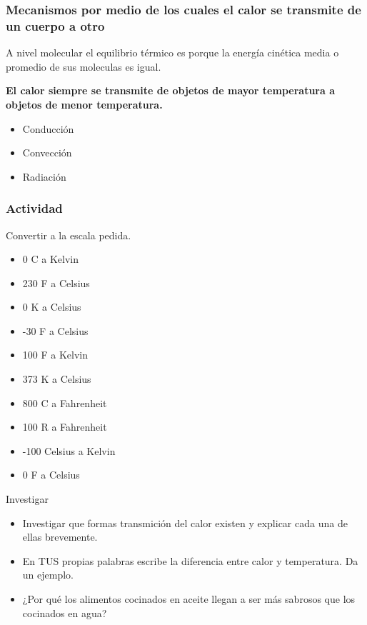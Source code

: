 \documentclass[handout]{beamer}
\begin{document}
\begin{frame}
  \frametitle{Mecanismos por medio de los cuales el calor se transmite de un cuerpo a
    otro}
  \begin{block}{}
    A nivel molecular el equilibrio térmico es porque la energía cinética media o promedio
    de sus moleculas es igual.
  \end{block}

  \begin{block}{}
    \textbf{El calor siempre se transmite de objetos de mayor temperatura a objetos de menor
      temperatura.}
  \end{block}
  \begin{itemize}
  \item Conducción
  \item Convección
  \item Radiación
  \end{itemize}
  
\end{frame}


\begin{frame}[allowframebreaks,t]
  \frametitle{Actividad}
Convertir a la escala pedida.
  \begin{itemize}
  \item 0 \textdegree C a Kelvin
  \item 230 \textdegree F a Celsius
  \item 0 K a Celsius
  \item -30 \textdegree F a Celsius
  \item 100 \textdegree F a Kelvin
  \item 373 K a Celsius
  \item 800 \textdegree C a Fahrenheit
  \item 100 R a Fahrenheit
  \item -100 Celsius a Kelvin
  \item 0 \textdegree F a Celsius
  \end{itemize}

\begin{block}{Investigar}
  \begin{itemize}
  \item Investigar que formas transmición del calor existen y explicar cada una de ellas brevemente.
  \item En TUS propias palabras escribe la diferencia entre calor y temperatura. Da un
    ejemplo.
  \item ¿Por qué los alimentos cocinados en aceite llegan a ser más sabrosos que los
    cocinados en agua?
  \end{itemize}
\end{block}

\end{frame}
\end{document}
